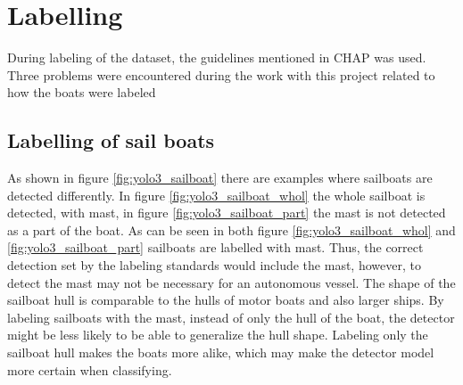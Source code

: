 \newpage

\section{Labelling}

During labeling of the dataset, the guidelines mentioned in CHAP was used. Three problems were encountered during the work with this project related to how the boats were labeled

\subsection{Labelling of sail boats}

As shown in figure \ref{fig:yolo3_sailboat} there are examples where sailboats are detected differently. In figure \ref{fig:yolo3_sailboat_whol} the whole sailboat is detected, with mast, in figure \ref{fig:yolo3_sailboat_part} the mast is not detected as a part of the boat. As can be seen in both figure \ref{fig:yolo3_sailboat_whol} and \ref{fig:yolo3_sailboat_part} sailboats are labelled with mast. Thus, the correct detection set by the labeling standards would include the mast, however, to detect the mast may not be necessary for an autonomous vessel. The shape of the sailboat hull is comparable to the hulls of motor boats and also larger ships. By labeling sailboats with the mast, instead of only the hull of the boat, the detector might be less likely to be able to generalize the hull shape. Labeling only the sailboat hull makes the boats more alike, which may make the detector model more certain when classifying. 



